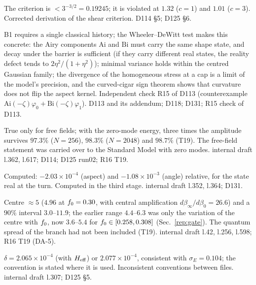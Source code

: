 \begin{description}
{The criterion is $<3^{-3/2}=0.19245$; it is violated at $1.32$ ($c=1$) and $1.01$ ($c=3$).}
{Corrected derivation of the shear criterion.}
{D114 \S5; D125 \S6.}

{B1 requires a single classical history; the Wheeler--DeWitt test makes this concrete: the Airy components $\mathrm{Ai}$ and $\mathrm{Bi}$ must carry the same shape state, and decay under the barrier is sufficient (if they carry different real states, the reality defect tends to $2\eta^2/(1+\eta^2)$); minimal variance holds within the centred Gaussian family; the divergence of the homogeneous stress at a cap is a limit of the model's precision, and the curved-cigar sign theorem shows that curvature does not flip the aspect kernel.}
{Independent check R15 of D113 (counterexample $\mathrm{Ai}(-\zeta)\varphi_0+\mathrm{Bi}(-\zeta)\varphi_1$).}
{D113 and its addendum; D118; D131; R15 check of D113.}

{True only for free fields; with the zero-mode energy, three times the amplitude survives $97.3\%$ ($N=256$), $98.3\%$ ($N=2048$) and $98.7\%$ (T19).}
{The free-field statement was carried over to the Standard Model with zero modes.}
{internal draft l.362, l.617; D114; D125 run02; R16 T19.}

{Computed: $-2.03\times10^{-4}$ (aspect) and $-1.08\times10^{-3}$ (angle) relative, for the state real at the turn.}
{Computed in the third stage.}
{internal draft l.352, l.364; D131.}

{Centre $\approx5$ ($4.96$ at $f_0=0.30$, with central amplification $d\beta_\infty/d\beta_0=26.6$) and a $90\%$ interval $3.0$--$11.9$; the earlier range $4.4$--$6.3$ was only the variation of the centre with $f_0$, now $3.6$--$5.4$ for $f_0\in[0.258,0.308]$ (Sec.~\ref{rep:gate}).}
{The quantum spread of the branch had not been included (T19).}
{internal draft l.42, l.256, l.598; R16 T19 (DA-5).}

{$\delta=2.065\times10^{-4}$ (with $H_{\rm eff}$) or $2.077\times10^{-4}$, consistent with $\sigma_E=0.104$; the convention is stated where it is used.}
{Inconsistent conventions between files.}
{internal draft l.307; D125 \S5.}


\end{description}
